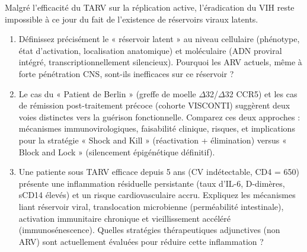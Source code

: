 \documentclass[11pt]{article}
\begin{document}
\begin{exercice}
Malgré l'efficacité du TARV sur la réplication active, l'éradication du VIH reste impossible à ce jour du fait de l'existence de réservoirs viraux latents.

\begin{enumerate}
    \item Définissez précisément le « réservoir latent » au niveau cellulaire (phénotype, état d'activation, localisation anatomique) et moléculaire (ADN proviral intégré, transcriptionnellement silencieux). Pourquoi les ARV actuels, même à forte pénétration CNS, sont-ils inefficaces sur ce réservoir ?
    \item Le cas du « Patient de Berlin » (greffe de moelle $\Delta$32/$\Delta$32 CCR5) et les cas de rémission post-traitement précoce (cohorte VISCONTI) suggèrent deux voies distinctes vers la guérison fonctionnelle. Comparez ces deux approches : mécanismes immunovirologiques, faisabilité clinique, risques, et implications pour la stratégie « Shock and Kill » (réactivation + élimination) versus « Block and Lock » (silencement épigénétique définitif).
    \item Une patiente sous TARV efficace depuis 5 ans (CV indétectable, CD4 = 650) présente une inflammation résiduelle persistante (taux d'IL-6, D-dimères, sCD14 élevés) et un risque cardiovasculaire accru. Expliquez les mécanismes liant réservoir viral, translocation microbienne (perméabilité intestinale), activation immunitaire chronique et vieillissement accéléré (immunosénescence). Quelles stratégies thérapeutiques adjunctives (non ARV) sont actuellement évaluées pour réduire cette inflammation ?
\end{enumerate}
\end{exercice}
\end{document}
